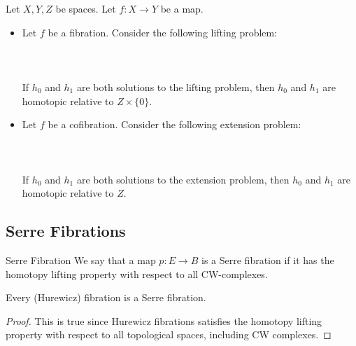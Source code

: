 \documentclass[a4paper]{article}
\begin{document}
\begin{prp}{}{} Let $X,Y,Z$ be spaces. Let $f:X\to Y$ be a map. 
\begin{itemize}
\item Let $f$ be a fibration. Consider the following lifting problem: \\~\\
\\~\\
If $h_0$ and $h_1$ are both solutions to the lifting problem, then $h_0$ and $h_1$ are homotopic relative to $Z\times\{0\}$. 
\item Let $f$ be a cofibration. Consider the following extension problem: \\~\\
\\~\\
If $h_0$ and $h_1$ are both solutions to the extension problem, then $h_0$ and $h_1$ are homotopic relative to $Z$. 
\end{itemize}
\end{prp}

\subsection{Serre Fibrations}
\begin{defn}{Serre Fibration}{} We say that a map $p:E\to B$ is a Serre fibration if it has the homotopy lifting property with respect to all CW-complexes. 
\end{defn}

\begin{lmm}{}{} Every (Hurewicz) fibration is a Serre fibration. \tcbline
\begin{proof}
This is true since Hurewicz fibrations satisfies the homotopy lifting property with respect to all topological spaces, including CW complexes. 
\end{proof}
\end{lmm}
\end{document}
